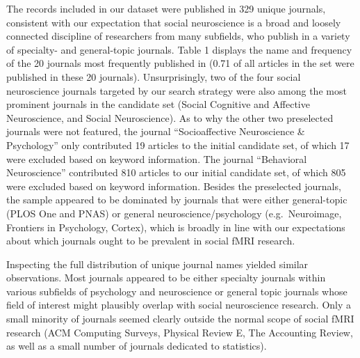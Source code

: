 \documentclass[
  man,floatsintext]{apa6}
\begin{document}
The records included in our dataset were published in 329 unique journals, consistent with our expectation that social neuroscience is a broad and loosely connected discipline of researchers from many subfields, who publish in a variety of specialty- and general-topic journals. Table 1 displays the name and frequency of the 20 journals most frequently published in (0.71 of all articles in the set were published in these 20 journals). Unsurprisingly, two of the four social neuroscience journals targeted by our search strategy were also among the most prominent journals in the candidate set (Social Cognitive and Affective Neuroscience, and Social Neuroscience). As to why the other two preselected journals were not featured, the journal ``Socioaffective Neuroscience \& Psychology'' only contributed 19 articles to the initial candidate set, of which 17 were excluded based on keyword information. The journal ``Behavioral Neuroscience'' contributed 810 articles to our initial candidate set, of which 805 were excluded based on keyword information. Besides the preselected journals, the sample appeared to be dominated by journals that were either general-topic (PLOS One and PNAS) or general neuroscience/psychology (e.g.~Neuroimage, Frontiers in Psychology, Cortex), which is broadly in line with our expectations about which journals ought to be prevalent in social fMRI research.

Inspecting the full distribution of unique journal names yielded similar observations. Most journals appeared to be either specialty journals within various subfields of psychology and neuroscience or general topic journals whose field of interest might plausibly overlap with social neuroscience research. Only a small minority of journals seemed clearly outside the normal scope of social fMRI research (ACM Computing Surveys, Physical Review E, The Accounting Review, as well as a small number of journals dedicated to statistics).
\end{document}
